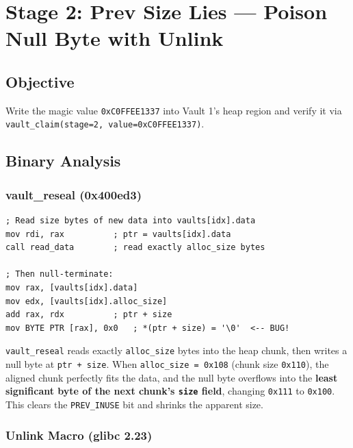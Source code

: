 \documentclass[12pt,a4paper]{article}
\begin{document}
\newpage
\section{Stage 2: Prev Size Lies — Poison Null Byte with Unlink}

\subsection{Objective}

Write the magic value \texttt{0xC0FFEE1337} into Vault 1's heap region and
verify it via \texttt{vault\_claim(stage=2, value=0xC0FFEE1337)}.

\subsection{Binary Analysis}

\subsubsection{vault\_reseal (0x400ed3)}

\begin{lstlisting}[style=asm, caption={vault\_reseal — off-by-one null byte overflow}]
; Read size bytes of new data into vaults[idx].data
mov rdi, rax          ; ptr = vaults[idx].data
call read_data        ; read exactly alloc_size bytes

; Then null-terminate:
mov rax, [vaults[idx].data]
mov edx, [vaults[idx].alloc_size]
add rax, rdx          ; ptr + size
mov BYTE PTR [rax], 0x0   ; *(ptr + size) = '\0'  <-- BUG!
\end{lstlisting}

\begin{vulnbox}
\texttt{vault\_reseal} reads exactly \texttt{alloc\_size} bytes into the
heap chunk, then writes a null byte at \texttt{ptr + size}. When
\texttt{alloc\_size = 0x108} (chunk size \texttt{0x110}), the aligned
chunk perfectly fits the data, and the null byte overflows into the
\textbf{least significant byte of the next chunk's \texttt{size} field},
changing \texttt{0x111} to \texttt{0x100}. This clears the
\texttt{PREV\_INUSE} bit and shrinks the apparent size.
\end{vulnbox}

\subsubsection{Unlink Macro (glibc 2.23)}
\end{document}
